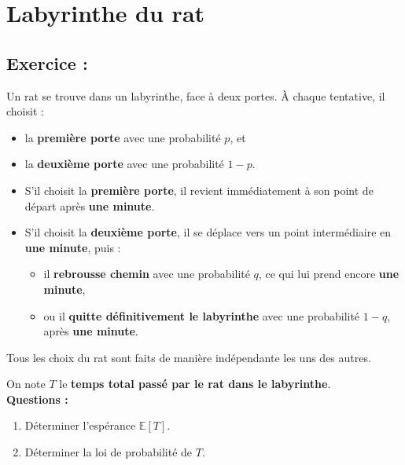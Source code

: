 \section{Labyrinthe du rat}

\subsection*{Exercice :}

\begin{exerciseBox}
Un rat se trouve dans un labyrinthe, face à deux portes. À chaque tentative, il choisit :

\begin{itemize}
  \item la \textbf{première porte} avec une probabilité \( p \), et
  \item la \textbf{deuxième porte} avec une probabilité \( 1 - p \).
\end{itemize}

\begin{itemize}
  \item S’il choisit la \textbf{première porte}, il revient immédiatement à son point de départ après \textbf{une minute}.
  \item S’il choisit la \textbf{deuxième porte}, il se déplace vers un point intermédiaire en \textbf{une minute}, puis :
  \begin{itemize}
    \item il \textbf{rebrousse chemin} avec une probabilité \( q \), ce qui lui prend encore \textbf{une minute}, 
    \item ou il \textbf{quitte définitivement le labyrinthe} avec une probabilité \( 1 - q \), après \textbf{une minute}.
  \end{itemize}
\end{itemize}

Tous les choix du rat sont faits de manière indépendante les uns des autres.

\vspace{0.5em}
On note \( T \) le \textbf{temps total passé par le rat dans le labyrinthe}.\\

\textbf{Questions :}
\begin{enumerate}
  \item Déterminer l’espérance \( \mathbb{E}[T] \).
  \item Déterminer la loi de probabilité de \( T \).
\end{enumerate}
\end{exerciseBox}

